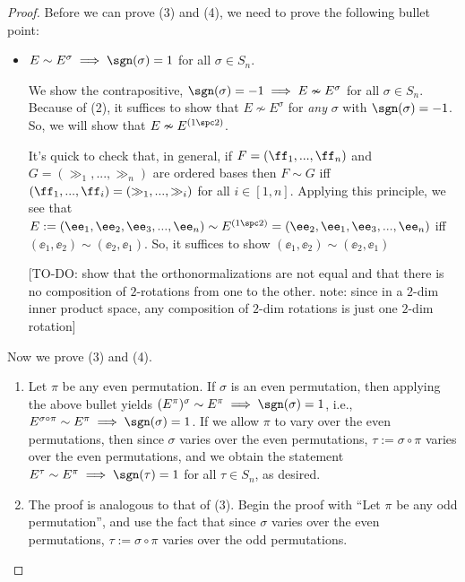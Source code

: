 \begin{proof}
    Before we can prove (3) and (4), we need to prove the following bullet point:

    \begin{itemize}
        \item $E \sim E^\sigma \implies \sgn(\sigma) = 1$ for all $\sigma \in S_n$.

        We show the contrapositive, $\sgn(\sigma) = -1 \implies E \nsim E^\sigma$ for all $\sigma \in S_n$. Because of (2), it suffices to show that $E \nsim E^\sigma$ for \textit{any} $\sigma$ with $\sgn(\sigma) = -1$. So, we will show that $E \nsim E^{(1 \spc 2)}$.

        It's quick to check that, in general, if $F = (\ff_1, ..., \ff_n)$ and $G = (\gg_1, ..., \gg_n)$ are ordered bases then $F \sim G$ iff $(\ff_1, ..., \ff_i) = (\gg_1, ..., \gg_i)$ for all $i \in [1, n]$. Applying this principle, we see that $E:= (\ee_1, \ee_2, \ee_3, ..., \ee_n) \sim E^{(1 \spc 2)} = (\ee_2, \ee_1, \ee_3, ..., \ee_n)$ iff $(\ee_1, \ee_2) \sim (\ee_2, \ee_1)$. So, it suffices to show $(\ee_1, \ee_2) \sim (\ee_2, \ee_1)$

        [TO-DO: show that the orthonormalizations are not equal and that there is no composition of $2$-rotations from one to the other. note: since in a $2$-dim inner product space, any composition of $2$-dim rotations is just one $2$-dim rotation]
    \end{itemize}

    Now we prove (3) and (4).
    
    \begin{enumerate}
        \item[3.] Let $\pi$ be any even permutation. If $\sigma$ is an even permutation, then applying the above bullet yields $(E^\pi)^\sigma \sim E^\pi \implies \sgn(\sigma) = 1$, i.e., $E^{\sigma \circ \pi} \sim E^\pi \implies \sgn(\sigma) = 1$. If we allow $\pi$ to vary over the even permutations, then since $\sigma$ varies over the even permutations, $\tau := \sigma \circ \pi$ varies over the even permutations, and we obtain the statement $E^\tau \sim E^\pi \implies \sgn(\tau) = 1$ for all $\tau \in S_n$, as desired.
        \item[4.] The proof is analogous to that of (3). Begin the proof with ``Let $\pi$ be any odd permutation'', and use the fact that since $\sigma$ varies over the even permutations, $\tau := \sigma \circ \pi$ varies over the odd permutations.
    \end{enumerate}
\end{proof}

